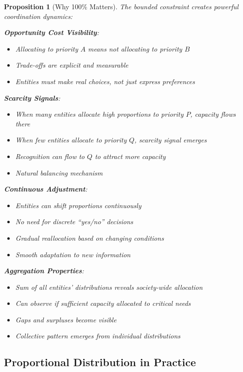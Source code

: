 \documentclass[11pt]{article}
\newtheorem{proposition}{Proposition}
\begin{document}
\begin{proposition}[Why 100\% Matters]
The bounded constraint creates powerful coordination dynamics:

\textbf{Opportunity Cost Visibility}:
\begin{itemize}
\item Allocating to priority $A$ means not allocating to priority $B$
\item Trade-offs are explicit and measurable
\item Entities must make real choices, not just express preferences
\end{itemize}

\textbf{Scarcity Signals}:
\begin{itemize}
\item When many entities allocate high proportions to priority $P$, capacity flows there
\item When few entities allocate to priority $Q$, scarcity signal emerges
\item Recognition can flow to $Q$ to attract more capacity
\item Natural balancing mechanism
\end{itemize}

\textbf{Continuous Adjustment}:
\begin{itemize}
\item Entities can shift proportions continuously
\item No need for discrete ``yes/no'' decisions
\item Gradual reallocation based on changing conditions
\item Smooth adaptation to new information
\end{itemize}

\textbf{Aggregation Properties}:
\begin{itemize}
\item Sum of all entities' distributions reveals society-wide allocation
\item Can observe if sufficient capacity allocated to critical needs
\item Gaps and surpluses become visible
\item Collective pattern emerges from individual distributions
\end{itemize}
\end{proposition}

\subsection{Proportional Distribution in Practice}
\end{document}
